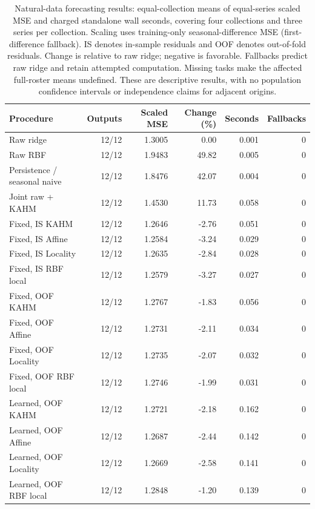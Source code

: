 \begin{table}[!htbp]
\centering\small\setlength{\tabcolsep}{4pt}
\caption{Natural-data forecasting results: equal-collection means of equal-series scaled MSE and charged standalone wall seconds, covering four collections and three series per collection. Scaling uses training-only seasonal-difference MSE (first-difference fallback). IS denotes in-sample residuals and OOF denotes out-of-fold residuals. Change is relative to raw ridge; negative is favorable. Fallbacks predict raw ridge and retain attempted computation. Missing tasks make the affected full-roster means undefined. These are descriptive results, with no population confidence intervals or independence claims for adjacent origins.}
\label{tab:target-archive-main}
\begin{tabular}{lrrrrr}
\toprule
Procedure & Outputs & Scaled MSE & Change (\%) & Seconds & Fallbacks \\
\midrule
Raw ridge & 12/12 & 1.3005 & 0.00 & 0.001 & 0 \\
Raw RBF & 12/12 & 1.9483 & 49.82 & 0.005 & 0 \\
Persistence / seasonal naive & 12/12 & 1.8476 & 42.07 & 0.004 & 0 \\
Joint raw + KAHM & 12/12 & 1.4530 & 11.73 & 0.058 & 0 \\
Fixed, IS KAHM & 12/12 & 1.2646 & -2.76 & 0.051 & 0 \\
Fixed, IS Affine & 12/12 & 1.2584 & -3.24 & 0.029 & 0 \\
Fixed, IS Locality & 12/12 & 1.2635 & -2.84 & 0.028 & 0 \\
Fixed, IS RBF local & 12/12 & 1.2579 & -3.27 & 0.027 & 0 \\
Fixed, OOF KAHM & 12/12 & 1.2767 & -1.83 & 0.056 & 0 \\
Fixed, OOF Affine & 12/12 & 1.2731 & -2.11 & 0.034 & 0 \\
Fixed, OOF Locality & 12/12 & 1.2735 & -2.07 & 0.032 & 0 \\
Fixed, OOF RBF local & 12/12 & 1.2746 & -1.99 & 0.031 & 0 \\
Learned, OOF KAHM & 12/12 & 1.2721 & -2.18 & 0.162 & 0 \\
Learned, OOF Affine & 12/12 & 1.2687 & -2.44 & 0.142 & 0 \\
Learned, OOF Locality & 12/12 & 1.2669 & -2.58 & 0.141 & 0 \\
Learned, OOF RBF local & 12/12 & 1.2848 & -1.20 & 0.139 & 0 \\
\bottomrule
\end{tabular}
\end{table}
